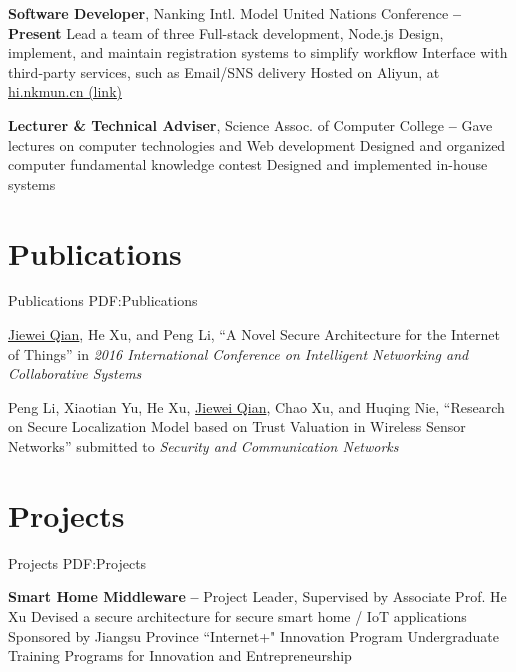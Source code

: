 \documentclass[a4paper,MMMyyyy,nonstop]{simpleresumecv}
\begin{document}
\begin{body}
\textbf{Software Developer}, Nanking Intl. Model United Nations Conference
\hfill \textbf{
      -- Present
}
\BulletItem
Lead a team of three
\BulletItem
Full-stack development, Node.js
\BulletItem
Design, implement, and maintain registration systems to simplify workflow
\BulletItem
Interface with third-party services, such as Email/SNS delivery
\BulletItem
Hosted on Aliyun, at \href{https://hi.nkmun.cn/}{hi.nkmun.cn (link)}

\GapNoBreak

\textbf{Lecturer \& Technical Adviser}, Science Assoc. of Computer College
\hfill \textbf{
     -- 
}
\BulletItem
Gave lectures on computer technologies and Web development
\BulletItem
Designed and organized computer fundamental knowledge contest
\BulletItem
Designed and implemented in-house systems


\section
{Publications}
{Publications}
{PDF:Publications}

\BulletItem
\underline{Jiewei Qian}, He Xu, and Peng Li,
``A Novel Secure Architecture for the Internet of Things''
in \textit{2016 International Conference on Intelligent Networking and Collaborative Systems}

\GapNoBreak

\BulletItem
Peng Li, Xiaotian Yu, He Xu, \underline{Jiewei Qian}, Chao Xu, and Huqing Nie,
``Research on Secure Localization Model based on Trust Valuation in Wireless Sensor Networks''
submitted to \textit{Security and Communication Networks}


\section
{Projects}
{Projects}
{PDF:Projects}

\textbf{Smart Home Middleware}
\hfill \textbf{  --  }
\BulletItem
Project Leader, Supervised by Associate Prof. He Xu
\BulletItem
Devised a secure architecture for secure smart home / IoT applications
\BulletItem
Sponsored by Jiangsu Province ``Internet+" Innovation Program
\BulletItem
Undergraduate Training Programs for Innovation and Entrepreneurship


\end{body}
\end{document}
